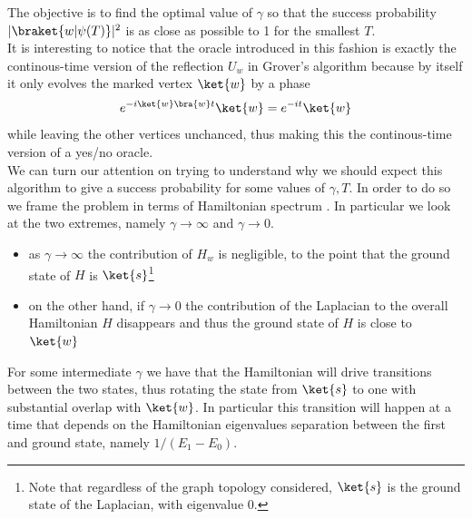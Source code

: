 \noindent
The objective is to find the optimal value of $\gamma$ so that the success probability $|\braket{w|\psi(T)}|^2$ is as close as possible to 1 for the smallest $T$. \\
It is interesting to notice that the oracle introduced in this fashion is exactly the continous-time version of the reflection $U_w$ in Grover's algorithm \cite{Wong2016} because by itself it only evolves the marked vertex $\ket{w}$ by a phase
\begin{equation}
  e^{-i\ket{w}\bra{w}t}\ket{w} = e^{-it}\ket{w}
\end{equation}
while leaving the other vertices unchanced, thus making this the continous-time version of a yes/no oracle. \\


\noindent
We can turn our attention on trying to understand why we should expect this algorithm to give a success probability for some values of $\gamma, T$. In order to do so we frame the problem in terms of Hamiltonian spectrum \cite{Childs2004}. In particular we look at the two extremes, namely $\gamma\rightarrow\infty$ and $\gamma\rightarrow 0$.
\begin{itemize}
  \item as $\gamma\rightarrow\infty$ the contribution of $H_w$ is negligible, to the point that the ground state of $H$ is $\ket{s}$\footnote{Note that regardless of the graph topology considered, $\ket{s}$ is the ground state of the Laplacian, with eigenvalue $0$.}
  \item on the other hand, if $\gamma\rightarrow 0$ the contribution of the Laplacian to the overall Hamiltonian $H$ disappears and thus the ground state of $H$ is close to $\ket{w}$
\end{itemize}
For some intermediate $\gamma$ we have that the Hamiltonian will drive transitions between the two states, thus rotating the state from $\ket{s}$ to one with substantial overlap with $\ket{w}$. In particular this transition will happen at a time that depends on the Hamiltonian eigenvalues separation between the first and ground state, namely $1/(E_1-E_0)$.



